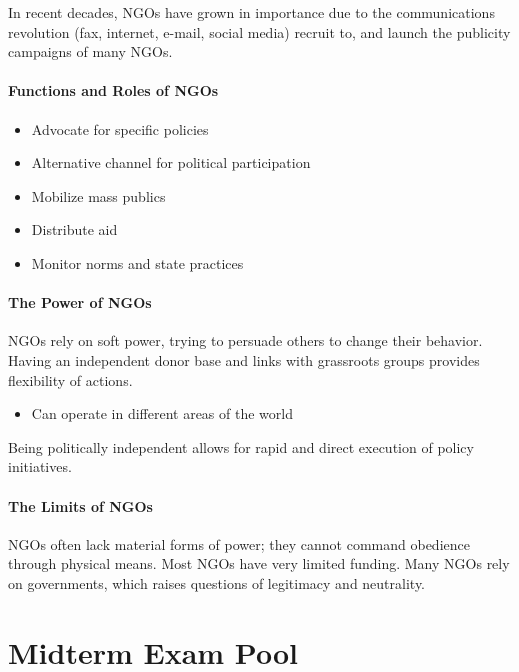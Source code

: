 \documentclass[
]{book}
\providecommand{\tightlist}{%
  \setlength{\itemsep}{0pt}\setlength{\parskip}{0pt}}
\begin{document}
In recent decades, NGOs have grown in importance due to the communications revolution (fax, internet, e-mail, social media) recruit to, and launch the publicity campaigns of many NGOs.

\hypertarget{functions-and-roles-of-ngos}{%
\subsubsection{Functions and Roles of NGOs}\label{functions-and-roles-of-ngos}}

\begin{itemize}
\item
  Advocate for specific policies
\item
  Alternative channel for political participation
\item
  Mobilize mass publics
\item
  Distribute aid
\item
  Monitor norms and state practices
\end{itemize}

\hypertarget{the-power-of-ngos}{%
\subsubsection{The Power of NGOs}\label{the-power-of-ngos}}

NGOs rely on soft power, trying to persuade others to change their behavior. Having an independent donor base and links with grassroots groups provides flexibility of actions.

\begin{itemize}
\tightlist
\item
  Can operate in different areas of the world
\end{itemize}

Being politically independent allows for rapid and direct execution of policy initiatives.

\hypertarget{the-limits-of-ngos}{%
\subsubsection{The Limits of NGOs}\label{the-limits-of-ngos}}

NGOs often lack material forms of power; they cannot command obedience through physical means. Most NGOs have very limited funding. Many NGOs rely on governments, which raises questions of legitimacy and neutrality.

\hypertarget{midterm-exam-pool}{%
\chapter*{Midterm Exam Pool}\label{midterm-exam-pool}}
\end{document}
